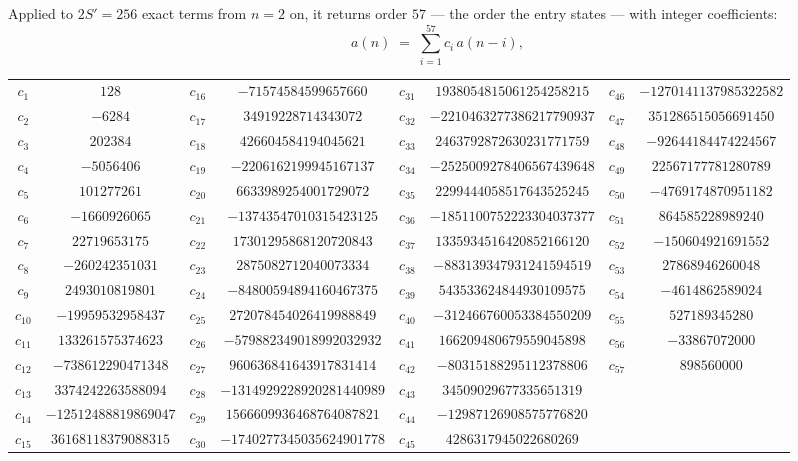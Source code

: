 \documentclass[11pt,a4paper]{article}
\theoremstyle{plain}
\theoremstyle{definition}
\begin{document}
Applied to $2S'=256$ exact terms from $n=2$ on, it returns order $57$ --- the
order the entry states --- with integer coefficients:
\[
a(n)\;=\;\sum_{i=1}^{57}c_i\,a(n-i),
\]
\begin{center}\small
\begin{tabular}{cccccccc}
$c_{1}$ & $128$ & $c_{16}$ & $-71574584599657660$ & $c_{31}$ & $1938054815061254258215$ & $c_{46}$ & $-1270141137985322582$ \\
$c_{2}$ & $-6284$ & $c_{17}$ & $34919228714343072$ & $c_{32}$ & $-2210463277386217790937$ & $c_{47}$ & $351286515056691450$ \\
$c_{3}$ & $202384$ & $c_{18}$ & $426604584194045621$ & $c_{33}$ & $2463792872630231771759$ & $c_{48}$ & $-92644184474224567$ \\
$c_{4}$ & $-5056406$ & $c_{19}$ & $-2206162199945167137$ & $c_{34}$ & $-2525009278406567439648$ & $c_{49}$ & $22567177781280789$ \\
$c_{5}$ & $101277261$ & $c_{20}$ & $6633989254001729072$ & $c_{35}$ & $2299444058517643525245$ & $c_{50}$ & $-4769174870951182$ \\
$c_{6}$ & $-1660926065$ & $c_{21}$ & $-13743547010315423125$ & $c_{36}$ & $-1851100752223304037377$ & $c_{51}$ & $864585228989240$ \\
$c_{7}$ & $22719653175$ & $c_{22}$ & $17301295868120720843$ & $c_{37}$ & $1335934516420852166120$ & $c_{52}$ & $-150604921691552$ \\
$c_{8}$ & $-260242351031$ & $c_{23}$ & $2875082712040073334$ & $c_{38}$ & $-883139347931241594519$ & $c_{53}$ & $27868946260048$ \\
$c_{9}$ & $2493010819801$ & $c_{24}$ & $-84800594894160467375$ & $c_{39}$ & $543533624844930109575$ & $c_{54}$ & $-4614862589024$ \\
$c_{10}$ & $-19959532958437$ & $c_{25}$ & $272078454026419988849$ & $c_{40}$ & $-312466760053384550209$ & $c_{55}$ & $527189345280$ \\
$c_{11}$ & $133261575374623$ & $c_{26}$ & $-579882349018992032932$ & $c_{41}$ & $166209480679559045898$ & $c_{56}$ & $-33867072000$ \\
$c_{12}$ & $-738612290471348$ & $c_{27}$ & $960636841643917831414$ & $c_{42}$ & $-80315188295112378806$ & $c_{57}$ & $898560000$ \\
$c_{13}$ & $3374242263588094$ & $c_{28}$ & $-1314929228920281440989$ & $c_{43}$ & $34509029677335651319$ &  &  \\
$c_{14}$ & $-12512488819869047$ & $c_{29}$ & $1566609936468764087821$ & $c_{44}$ & $-12987126908575776820$ &  &  \\
$c_{15}$ & $36168118379088315$ & $c_{30}$ & $-1740277345035624901778$ & $c_{45}$ & $4286317945022680269$ &  &  \\
\end{tabular}
\end{center}
\end{document}
